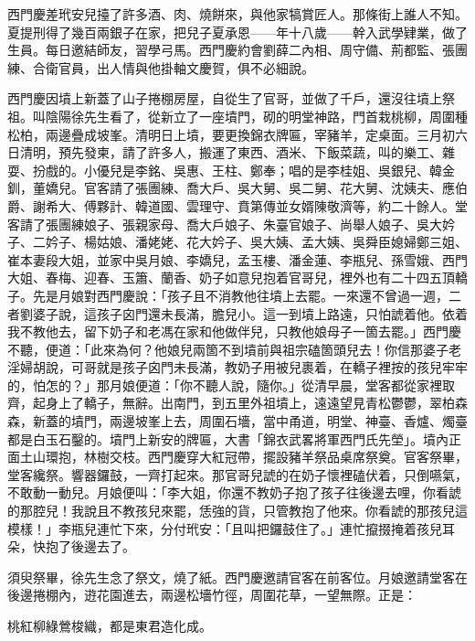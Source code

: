 西門慶差玳安兒擡了許多酒、肉、燒餅來，與他家犒賞匠人。那條街上誰人不知。夏提刑得了幾百兩銀子在家，把兒子夏承恩——年十八歲——幹入武學肄業，做了生員。{}每日邀結師友，習學弓馬。西門慶約會劉薛二內相、周守備、荊都監、張團練、合衛官員，出人情與他掛軸文慶賀，俱不必細說。

西門慶因墳上新蓋了山子捲棚房屋，自從生了官哥，並做了千戶，還沒往墳上祭祖。叫陰陽徐先生看了，從新立了一座墳門，砌的明堂神路，門首栽桃柳，周圍種松柏，兩邊疊成坡峯。清明日上墳，要更換錦衣牌匾，宰豬羊，定桌面。三月初六日清明，預先發柬，請了許多人，搬運了東西、酒米、下飯菜蔬，叫的樂工、雜耍、扮戲的。小優兒是李銘、吳惠、王柱、鄭奉；唱的是李桂姐、吳銀兒、韓金釧，董嬌兒。官客請了張團練、喬大戶、吳大舅、吳二舅、花大舅、沈姨夫、應伯爵、謝希大、傅夥計、韓道國、雲理守、賁第傳並女婿陳敬濟等，約二十餘人。堂客請了張團練娘子、張親家母、喬大戶娘子、朱臺官娘子、尚舉人娘子、吳大妗子、二妗子、楊姑娘、潘姥姥、花大妗子、吳大姨、孟大姨、吳舜臣媳婦鄭三姐、崔本妻段大姐，並家中吳月娘、李嬌兒，孟玉樓、潘金蓮、李瓶兒、孫雪娥、西門大姐、春梅、迎春、玉簫、蘭香、奶子如意兒抱着官哥兒，裡外也有二十四五頂轎子。先是月娘對西門慶說：「孩子且不消教他往墳上去罷。一來還不曾過一週，二者劉婆子說，這孩子囟門還未長滿，膽兒小。這一到墳上路遠，只怕諕着他。{}依着我不教他去，留下奶子和老馮在家和他做伴兒，只教他娘母子一箇去罷。」西門慶不聽，便道：「此來為何？他娘兒兩箇不到墳前與祖宗磕箇頭兒去！你信那婆子老淫婦胡說，可哥就是孩子囟門未長滿，教奶子用被兒裹着，在轎子裡按的孩兒牢牢的，怕怎的？」那月娘便道：「你不聽人說，隨你。」從清早晨，堂客都從家裡取齊，起身上了轎子，無辭。出南門，到五里外祖墳上，遠遠望見青松鬱鬱，翠柏森森，新蓋的墳門，兩邊坡峯上去，周圍石墻，當中甬道，明堂、神臺、香爐、燭臺都是白玉石鑿的。墳門上新安的牌匾，大書「錦衣武畧將軍西門氏先塋」。墳內正面土山環抱，林樹交枝。西門慶穿大紅冠帶，擺設豬羊祭品桌席祭奠。官客祭畢，堂客纔祭。響器鑼鼓，一齊打起來。那官哥兒諕的在奶子懷裡磕伏着，只倒嚥氣，不敢動一動兒。月娘便叫：「李大姐，你還不教奶子抱了孩子往後邊去哩，你看諕的那腔兒！{}我說且不教孩兒來罷，恁強的貨，只管教抱了他來。你看諕的那孩兒這模樣！」李瓶兒連忙下來，分付玳安：「且叫把鑼鼓住了。」連忙攛掇掩着孩兒耳朵，快抱了後邊去了。

須臾祭畢，徐先生念了祭文，燒了紙。西門慶邀請官客在前客位。月娘邀請堂客在後邊捲棚內，逰花園進去，兩邊松墻竹徑，周圍花草，一望無際。正是：

\begin{myquote}
桃紅柳綠鶯梭織，都是東君造化成。
\end{myquote}

